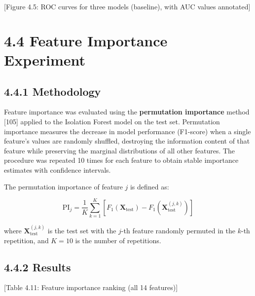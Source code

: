 \documentclass[
  a4paper]{report}
\begin{document}
{[}Figure 4.5: ROC curves for three models (baseline), with AUC values
annotated{]}

\section{4.4 Feature Importance
Experiment}\label{feature-importance-experiment}

\subsection{4.4.1 Methodology}\label{methodology}

Feature importance was evaluated using the \textbf{permutation
importance} method {[}105{]} applied to the Isolation Forest model on
the test set. Permutation importance measures the decrease in model
performance (F1-score) when a single feature's values are randomly
shuffled, destroying the information content of that feature while
preserving the marginal distributions of all other features. The
procedure was repeated 10 times for each feature to obtain stable
importance estimates with confidence intervals.

The permutation importance of feature \(j\) is defined as:

\[\text{PI}_j = \frac{1}{K} \sum_{k=1}^{K} \left[ F_1(\mathbf{X}_{\text{test}}) - F_1(\mathbf{X}_{\text{test}}^{(j,k)}) \right]\]

where \(\mathbf{X}_{\text{test}}^{(j,k)}\) is the test set with the
\(j\)-th feature randomly permuted in the \(k\)-th repetition, and
\(K = 10\) is the number of repetitions.

\subsection{4.4.2 Results}\label{results}

{[}Table 4.11: Feature importance ranking (all 14 features){]}
\end{document}
